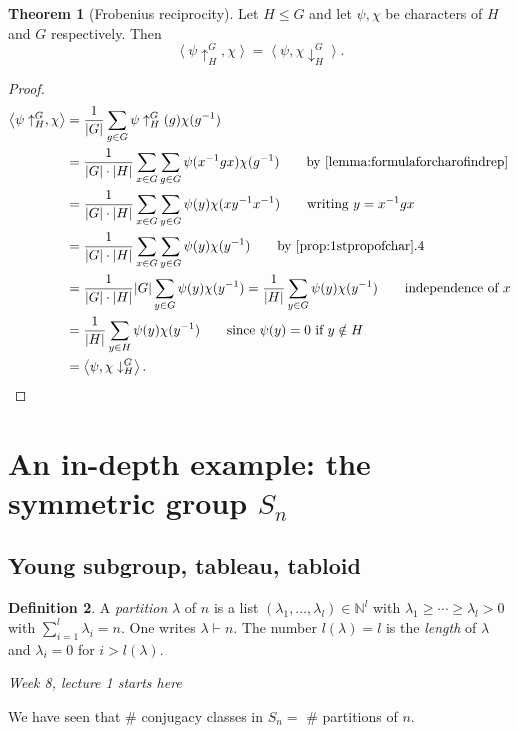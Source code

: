 \documentclass[a4paper]{article}
\newcommand{\la}{\left\langle}
\newcommand{\ra}{\right\rangle}
\newcommand{\N}{\mathbb{N}}
\theoremstyle{definition}
\newtheorem{defn}{Definition}[subsection]
\newtheorem{thm}[defn]{Theorem}
\begin{document}
\begin{thm}[Frobenius reciprocity]
Let $H\leq G$ and let $\psi,\chi$ be characters of $H$ and $G$ respectively. Then
\[
\la\psi\uparrow_H^G,\chi\ra=\la\psi,\chi\downarrow_H^G\ra.
\]
\end{thm}
\begin{proof}
\[
\begin{aligned}
\la\psi\uparrow_H^G,\chi\ra&=\frac{1}{|G|}\sum_{g\in G}\psi\uparrow_H^G(g)\chi(g^{-1}) \\
&=\frac{1}{|G|\cdot|H|}\sum_{x\in G}\sum_{g\in G}\psi(x^{-1}gx)\chi(g^{-1}) \qquad \text{by \ref{lemma:formulaforcharofindrep}}\\
&=\frac{1}{|G|\cdot|H|}\sum_{x\in G}\sum_{y\in G} \psi(y)\chi(xy^{-1}x^{-1})\qquad\text{writing }y=x^{-1}gx\\
&=\frac{1}{|G|\cdot|H|}\sum_{x\in G}\sum_{y\in G} \psi(y)\chi(y^{-1})\qquad\text{by \ref{prop:1stpropofchar}.4}\\
&=\frac{1}{|G|\cdot|H|}|G|\sum_{y\in G}\psi(y)\chi(y^{-1})=\frac{1}{|H|}\sum_{y\in G}\psi(y)\chi(y^{-1}) \qquad\text{independence of }x\\
&=\frac{1}{|H|}\sum_{y\in H}\psi(y)\chi(y^{-1}) \qquad\text{since }\psi(y)=0\text{ if } y\notin H\\
&=\la\psi,\chi\downarrow_H^G\ra.
\end{aligned}
\]
\end{proof}

\section{An in-depth example: the symmetric group $S_n$}
\subsection{Young subgroup, tableau, tabloid}
\begin{defn}
A \textit{partition} $\lambda$ of $n$ is a list $(\lambda_1,\ldots,\lambda_l)\in\N^l$ with $\lambda_1\geq\cdots\geq\lambda_l>0$ with $\sum_{i=1}^l \lambda_i=n$. One writes $\lambda\vdash n$. The number $l(\lambda)=l$ is the \textit{length} of $\lambda$ and $\lambda_i=0$ for $i>l(\lambda)$.
\end{defn}

\begin{flushright}
\textit{Week 8, lecture 1 starts here}
\end{flushright}

We have seen that \# conjugacy classes in $S_n=$ \# partitions of $n$.
\end{document}
